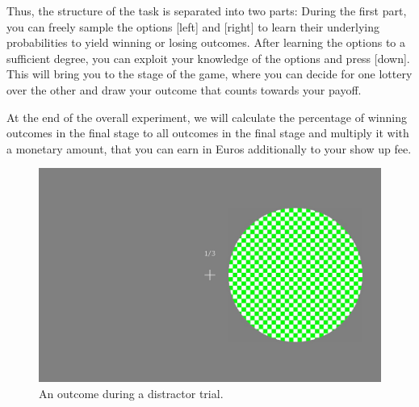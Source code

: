 \documentclass[12pt, oneside]{scrartcl}
\begin{document}
Thus, the structure of the task is separated into two parts: During the first part, you can freely sample the options [left] and [right] to learn their underlying probabilities to yield winning or losing outcomes. After learning the options to a sufficient degree, you can exploit your knowledge of the options and press [down]. This will bring you to the stage of the game, where you can decide for one lottery over the other and draw your outcome that counts towards your payoff. \vspace{\baselineskip}

At the end of the overall experiment, we will calculate the percentage of winning outcomes in the final stage to all outcomes in the final stage and multiply it with a monetary amount, that you can earn in Euros additionally to your show up fee. \vspace{\baselineskip}

\begin{figure}[h!]
\begin{center}
\includegraphics[scale=0.2]{distrRight.jpg}
\caption{An outcome during a distractor trial.}
\label{distrRight}
\end{center}
\end{figure}
\end{document}
